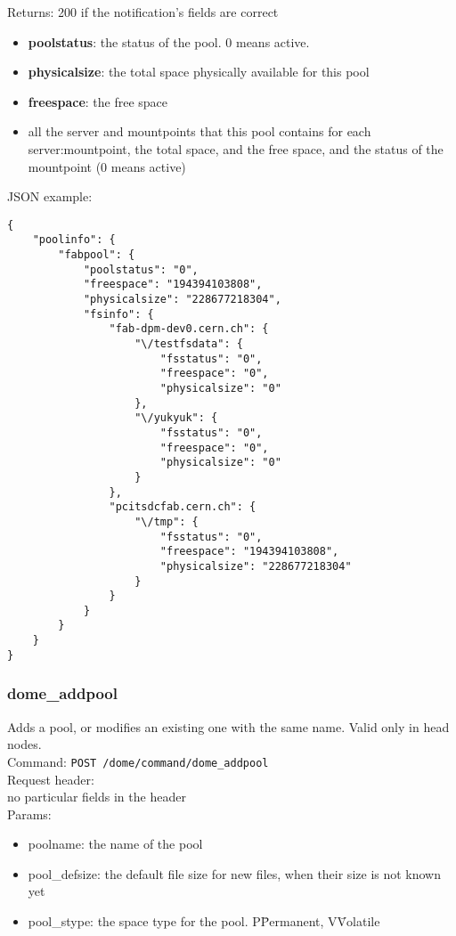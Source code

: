 \documentclass[a4paper,10pt]{scrreprt}
\begin{document}
Returns: 200 if the notification's fields are correct
\begin{itemize}
 \item \textbf{poolstatus}: the status of the pool. 0 means active.
 \item \textbf{physicalsize}: the total space physically available for this pool
 \item \textbf{freespace}: the free space


 \item all the server and mountpoints that this pool contains
 \subitem for each server:mountpoint, the total space, and the free space, and the status of the mountpoint (0 means active)
\end{itemize}

JSON example:\\
\begin{lstlisting}
{
    "poolinfo": {
        "fabpool": {
            "poolstatus": "0",
            "freespace": "194394103808",
            "physicalsize": "228677218304",
            "fsinfo": {
                "fab-dpm-dev0.cern.ch": {
                    "\/testfsdata": {
                        "fsstatus": "0",
                        "freespace": "0",
                        "physicalsize": "0"
                    },
                    "\/yukyuk": {
                        "fsstatus": "0",
                        "freespace": "0",
                        "physicalsize": "0"
                    }
                },
                "pcitsdcfab.cern.ch": {
                    "\/tmp": {
                        "fsstatus": "0",
                        "freespace": "194394103808",
                        "physicalsize": "228677218304"
                    }
                }
            }
        }
    }
}
\end{lstlisting}



\subsubsection{dome\_addpool}
Adds a pool, or modifies an existing one with the same name. Valid only in head nodes.\\
Command:
\lstinline"POST /dome/command/dome_addpool"\\

Request header:\\
 no particular fields in the header\\

Params:
\begin{itemize}
 \item poolname: the name of the pool
 \item pool\_defsize: the default file size for new files, when their size is not known yet
 \item pool\_stype: the space type for the pool. P\=Permanent, V\=Volatile
\end{itemize}
\end{document}
